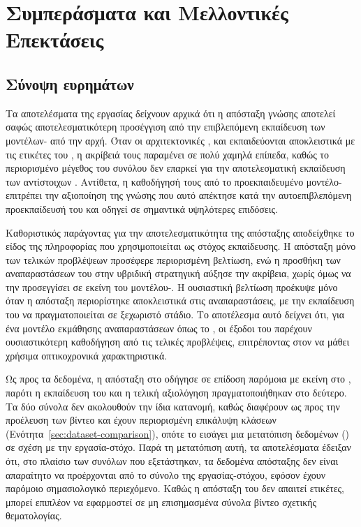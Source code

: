 \chapter{Συμπεράσματα και Μελλοντικές Επεκτάσεις}
\label{ch:conclusions}

\section{Σύνοψη ευρημάτων}
\label{sec:conclusions-findings}

Τα αποτελέσματα της εργασίας δείχνουν αρχικά ότι η απόσταξη γνώσης
αποτελεί σαφώς αποτελεσματικότερη προσέγγιση από την επιβλεπόμενη
εκπαίδευση των μοντέλων- από την αρχή. Όταν οι
αρχιτεκτονικές ,  και  εκπαιδεύονται
αποκλειστικά με τις ετικέτες του , η ακρίβειά τους παραμένει
σε πολύ χαμηλά επίπεδα, καθώς το περιορισμένο μέγεθος του συνόλου δεν
επαρκεί για την αποτελεσματική εκπαίδευση των αντίστοιχων
. Αντίθετα, η καθοδήγησή τους από το
προεκπαιδευμένο μοντέλο- επιτρέπει την αξιοποίηση της γνώσης
που αυτό απέκτησε κατά την αυτοεπιβλεπόμενη προεκπαίδευσή του και
οδηγεί σε σημαντικά υψηλότερες επιδόσεις.

Καθοριστικός παράγοντας για την αποτελεσματικότητα της απόσταξης
αποδείχθηκε το είδος της πληροφορίας που χρησιμοποιείται ως στόχος
εκπαίδευσης. Η απόσταξη μόνο των τελικών προβλέψεων προσέφερε περιορισμένη
βελτίωση, ενώ η προσθήκη των αναπαραστάσεων του  στην
υβριδική στρατηγική αύξησε την ακρίβεια, χωρίς όμως να την
προσεγγίσει σε εκείνη του μοντέλου-. Η ουσιαστική
βελτίωση προέκυψε μόνο όταν η απόσταξη περιορίστηκε αποκλειστικά στις
αναπαραστάσεις, με την εκπαίδευση του  να
πραγματοποιείται σε ξεχωριστό στάδιο. Το αποτέλεσμα αυτό δείχνει ότι, για ένα
μοντέλο εκμάθησης αναπαραστάσεων όπως το , οι έξοδοι του
 παρέχουν ουσιαστικότερη καθοδήγηση από τις τελικές
προβλέψεις, επιτρέποντας στον  να μάθει χρήσιμα
οπτικοχρονικά χαρακτηριστικά.

Ως προς τα δεδομένα, η απόσταξη στο  οδήγησε σε επίδοση
παρόμοια με εκείνη στο , παρότι η εκπαίδευση του
 και η τελική αξιολόγηση πραγματοποιήθηκαν
στο δεύτερο. Τα δύο σύνολα δεν ακολουθούν την ίδια κατανομή, καθώς
διαφέρουν ως προς την προέλευση των βίντεο και έχουν περιορισμένη
επικάλυψη κλάσεων (Ενότητα~\ref{sec:dataset-comparison}), οπότε το
 εισάγει μια μετατόπιση δεδομένων () σε
σχέση με την εργασία-στόχο. Παρά τη μετατόπιση αυτή, τα αποτελέσματα
έδειξαν ότι, στο πλαίσιο των συνόλων που εξετάστηκαν, τα δεδομένα
απόσταξης δεν είναι απαραίτητο να προέρχονται από το σύνολο της
εργασίας-στόχου, εφόσον έχουν παρόμοιο σημασιολογικό περιεχόμενο. Καθώς η απόσταξη του  δεν
απαιτεί ετικέτες, μπορεί επιπλέον να εφαρμοστεί σε μη επισημασμένα
σύνολα βίντεο σχετικής θεματολογίας. 


